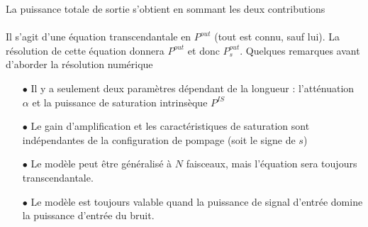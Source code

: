 La puissance totale de sortie s'obtient en sommant les deux contributions\\

\ \\

Il s'agit d'une équation transcendantale en $P^{out}$ (tout est connu, sauf lui). La résolution 
de cette équation donnera $P^{out}$ et donc $P^{out}_s$. Quelques remarques avant d'aborder la 
résolution numérique
\begin{itemize}
\item[$\bullet$] Il y a seulement deux paramètres dépendant de la longueur : l'atténuation $\alpha$ et
la puissance de saturation intrinsèque $P^{IS}$
\item[$\bullet$] Le gain d'amplification et les caractéristiques de saturation sont indépendantes
de la configuration de pompage (soit le signe de $s$)
\item[$\bullet$] Le modèle peut être généralisé à $N$ faisceaux, mais l'équation sera toujours
transcendantale. 
\item[$\bullet$] Le modèle est toujours valable quand la puissance de signal d'entrée domine la 
puissance d'entrée du bruit.
\end{itemize}\ 

